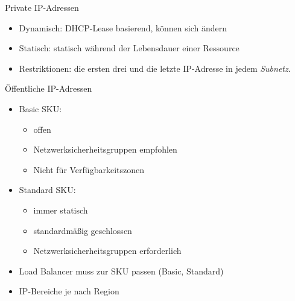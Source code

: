 

\begin{flashcard}[Definition]{Private IP-Adressen}
    \begin{itemize}
        \item Dynamisch: DHCP-Lease basierend, können sich ändern
        \item Statisch: statisch während der Lebensdauer einer Ressource
        \item Restriktionen: die ersten drei und die letzte IP-Adresse in jedem \emph{Subnetz}.
    \end{itemize}
\end{flashcard}


\begin{flashcard}[Definition]{Öffentliche IP-Adressen}
    \begin{itemize}
        \item Basic SKU:
            \begin{itemize}
                \item offen
                \item Netzwerksicherheitsgruppen empfohlen
                \item[!] Nicht für Verfügbarkeitszonen
            \end{itemize}
        \item Standard SKU:
            \begin{itemize}
                \item immer statisch
                \item standardmäßig geschlossen
                \item Netzwerksicherheitsgruppen erforderlich
            \end{itemize}
        \item Load Balancer muss zur SKU passen (Basic, Standard)
        \item IP-Bereiche je nach Region
    \end{itemize}
\end{flashcard}

